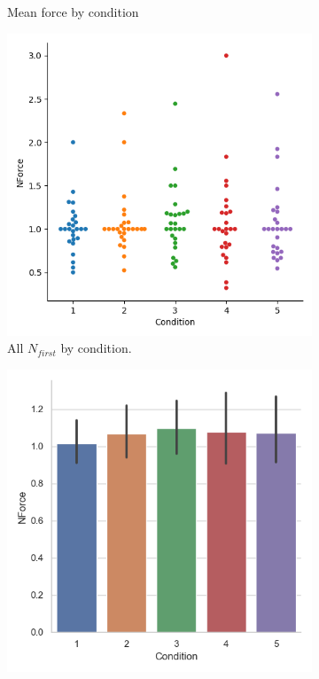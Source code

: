 \begin{figure}[H]
\begin{subfigure}[b]{0.4\textwidth}
         \caption{Mean force by condition}
         \label{fig:allForceMeanCond}
     \end{subfigure}          
     \hspace*{\fill}
     \begin{subfigure}[b]{0.4\textwidth}
         \centering
         \includegraphics[width=\textwidth]{Files/Plots/forceNforce_by_cond_swarm.png}
         \caption{All $N_{first}$ by condition. }
         \label{fig:allN1NCond}
     \end{subfigure}
     \hspace*{\fill}
     \begin{subfigure}[b]{0.4\textwidth}
         \centering
         \includegraphics[width=\textwidth]{Files/Plots/forceNforce_mean_by_condition.png}

\end{subfigure}
\end{figure}
